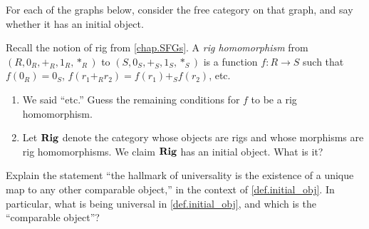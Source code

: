 \documentclass[7Sketches]{subfiles}
\begin{document}
\begin{exercise} %
\label{exc.initial_object}
For each of the graphs below, consider the free category on that graph, and say whether it has an initial object.\\
\begin{enumerate*}[itemjoin=\hspace{.8in}]
	\item {}
	\item {}
	\item {}
	\item {}
	\qedhere
\end{enumerate*}
\end{exercise}

\begin{exercise}%
\label{exc.rig_initial_obj}
Recall the notion of rig from \cref{chap.SFGs}. A \emph{rig homomorphism} from $(R,0_R,+_R,1_R,*_R)$ to $(S,0_S,+_S,1_S, *_S)$ is a function $f\colon R\to S$ such that $f(0_R)=0_S$, $f(r_1+_Rr_2)=f(r_1)+_Sf(r_2)$, etc.
\begin{enumerate}
	\item We said ``etc.'' Guess the remaining conditions for $f$ to be a rig homomorphism.
	\item Let $\mathbf{Rig}$ denote the category whose objects are rigs and whose morphisms are rig homomorphisms. We claim $\mathbf{Rig}$ has an initial object. What is it?
	\qedhere
\end{enumerate}	
\end{exercise}


\begin{exercise} %
\label{exc.universality}
Explain the statement ``the hallmark of universality is the existence of a
unique map to any other comparable object,'' in the context of
\cref{def.initial_obj}. In particular, what is being universal in \cref{def.initial_obj}, and which is the ``comparable object''?
\end{exercise}
\end{document}
